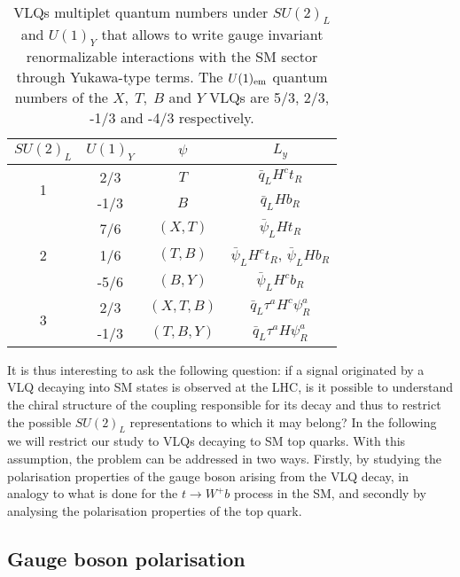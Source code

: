 \documentclass[a4paper]{article}
\begin{document}
\begin{table}[htbp]
\centering
\begin{tabular}{c|c|c|c}
$SU(2)_L$ 						& $U(1)_Y$ & $\psi$     & $L_y$  \\ 
\hline
\hline
%
\multirow{ 2}{*}{1} 				& 2/3		 & $T$  		  & $\bar q_L H^c t_R$  \\
										& -1/3 		 & $B$  		  & $\bar q_L H b_R$   \\ 
							\hline
\multirow{ 3}{*}{2}				& 7/6  		 & $(X,T)$    & $\bar \psi_L H t_R$  \\
										& 1/6 		 & $(T,B)$    & $\bar \psi_L H^c t_R$, $\bar \psi_L H b_R$  \\
										& -5/6 		 & $(B,Y)$    & $\bar \psi_L H^c b_R$  \\			
\hline
\multirow{ 2}{*}{3} 				&  2/3		 & $(X,T,B)$ & $\bar q_L\tau^a H^c \psi_R^a$\\		
										&  -1/3		 & $(T,B,Y)$ & $\bar q_L\tau^a H \psi_R^a$\\			
\end{tabular}
\caption{VLQs multiplet quantum numbers under $SU(2)_L$ and $U(1)_Y$ that allows to write gauge invariant renormalizable interactions with the SM sector through Yukawa-type terms. The $U(1)_{\rm em}$ quantum numbers of the $X,\;T,\;B$ and $Y$ VLQs are 5/3, 2/3, -1/3 and -4/3 respectively.}
\label{tab:reppr}
\end{table}

It is thus interesting to ask the following question: if a signal originated by a VLQ decaying into SM states is observed at the LHC, is it possible to understand the chiral structure of the coupling responsible for its decay and thus to restrict the possible $SU(2)_L$ representations to which it may belong? In the following we will restrict our study to VLQs decaying to SM top quarks. With this assumption, the problem can be addressed in two ways. Firstly, by studying the polarisation properties of the gauge boson arising from the VLQ decay, in analogy to what is done for the $t\to W^+ b$ process in the SM, and secondly by analysing the polarisation properties of the top quark. 

\subsection{Gauge boson polarisation}
\end{document}
